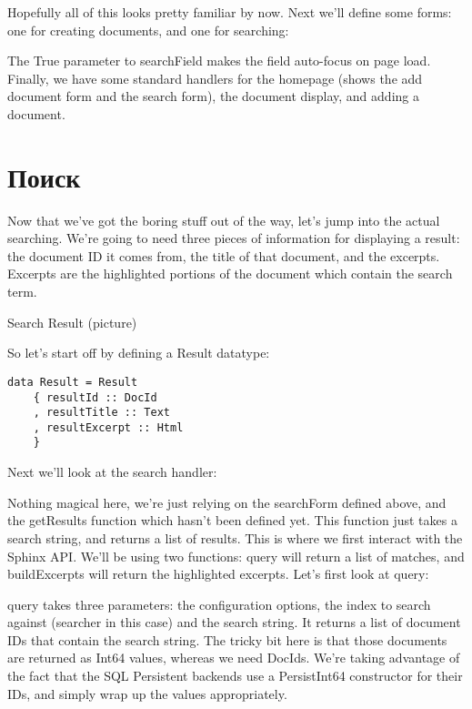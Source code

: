 

Hopefully all of this looks pretty familiar by now. Next we'll define some forms: one for creating documents, and one for searching:



The True parameter to searchField makes the field auto-focus on page load. Finally, we have some standard handlers for the homepage (shows the add document form and the search form), the document display, and adding a document.



\section{Поиск} %

Now that we've got the boring stuff out of the way, let's jump into the actual searching. We're going to need three pieces of information for displaying a result: the document ID it comes from, the title of that document, and the excerpts. Excerpts are the highlighted portions of the document which contain the search term.

Search Result (picture)

So let's start off by defining a Result datatype:

\begin{lstlisting}
data Result = Result
    { resultId :: DocId
    , resultTitle :: Text
    , resultExcerpt :: Html
    }
\end{lstlisting}

Next we'll look at the search handler:



Nothing magical here, we're just relying on the searchForm defined above, and the getResults function which hasn't been defined yet. This function just takes a search string, and returns a list of results. This is where we first interact with the Sphinx API. We'll be using two functions: query will return a list of matches, and buildExcerpts will return the highlighted excerpts. Let's first look at query:



query takes three parameters: the configuration options, the index to search against (searcher in this case) and the search string. It returns a list of document IDs that contain the search string. The tricky bit here is that those documents are returned as Int64 values, whereas we need DocIds. We're taking advantage of the fact that the SQL Persistent backends use a PersistInt64 constructor for their IDs, and simply wrap up the values appropriately.

